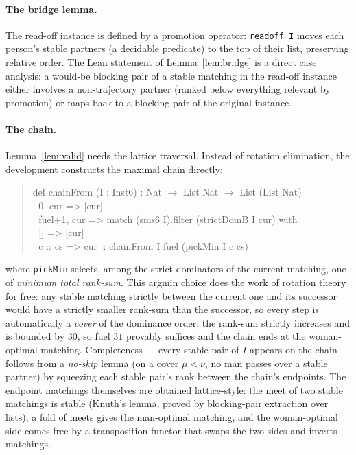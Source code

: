 \documentclass[11pt]{article}
\begin{document}
\paragraph{The bridge lemma.} The read-off instance is defined by a promotion
operator: \texttt{readoff I} moves each person's stable partners (a decidable
predicate) to the top of their list, preserving relative order. The Lean statement
of Lemma~\ref{lem:bridge} is a direct case analysis: a would-be blocking pair of a
stable matching in the read-off instance either involves a non-trajectory partner
(ranked below everything relevant by promotion) or maps back to a blocking pair of
the original instance.

\paragraph{The chain.} Lemma~\ref{lem:valid} needs the lattice traversal. Instead
of rotation elimination, the development constructs the maximal chain directly:
\begin{quote}\small\ttfamily
def chainFrom (I : Inst6) : Nat $\to$ List Nat $\to$ List (List Nat)\\
\phantom{xx}| 0, cur => [cur]\\
\phantom{xx}| fuel+1, cur => match (sms6 I).filter (strictDomB I cur) with\\
\phantom{xxxx}| [] => [cur]\\
\phantom{xxxx}| c :: cs => cur :: chainFrom I fuel (pickMin I c cs)
\end{quote}
where \texttt{pickMin} selects, among the strict dominators of the current
matching, one of \emph{minimum total rank-sum}. This argmin choice does the work of
rotation theory for free: any stable matching strictly between the current one and
its successor would have a strictly smaller rank-sum than the successor, so every
step is automatically a \emph{cover} of the dominance order; the rank-sum strictly
increases and is bounded by $30$, so fuel $31$ provably suffices and the chain ends
at the woman-optimal matching. Completeness --- every stable pair of $I$ appears on
the chain --- follows from a \emph{no-skip} lemma (on a cover $\mu\lessdot\nu$, no
man passes over a stable partner) by squeezing each stable pair's rank between the
chain's endpoints. The endpoint matchings themselves are obtained lattice-style:
the meet of two stable matchings is stable (Knuth's lemma, proved by blocking-pair
extraction over lists), a fold of meets gives the man-optimal matching, and the
woman-optimal side comes free by a transposition functor that swaps the two sides
and inverts matchings.
\end{document}
